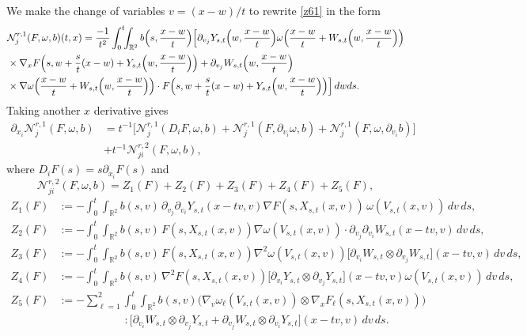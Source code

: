 \documentclass[reqno,11pt]{amsart}
\numberwithin{equation}{section}
\def\R{{\mathbb R}}
\def\R{{\bf R}}
\def\R{\mathbb{R}}
\begin{document}
We make the change of variables $v=(x-w)/t$ to rewrite \eqref{z61} in the form
\begin{align*}
&\mathcal N_j^{r,1}(F,\omega,b)(t,x)
=\frac{-1}{t^2}\int_0^t\!\!\int_{\mathbb R^2}b\Big(s,\frac{x-w}{t}\Big)
\Big[\partial_{v_j}Y_{s,t}\Big(w,\frac{x-w}{t}\Big)\omega\Big(\frac{x-w}{t}+W_{s,t}\Big(w,\frac{x-w}{t}\Big)\Big)\\
&\times\nabla_xF\Big(s,w+\frac{s}{t}(x-w)+Y_{s,t}\Big(w,\frac{x-w}{t}\Big)\Big)+\partial_{v_j}W_{s,t}\Big(w,\frac{x-w}{t}\Big)
\notag\\
&\times \nabla\omega\Big(\frac{x-w}{t}+W_{s,t}\Big(w,\frac{x-w}{t}\Big)\Big)\cdot F\Big(s,w+\frac{s}{t}(x-w)+Y_{s,t}\Big(w,\frac{x-w}{t}\Big)\Big)
\Big]\,dwds.
\end{align*}
Taking another $x$ derivative gives
\begin{equation}\label{n25}
\begin{split}
\partial_{x_i}\mathcal N_j^{r,1}(F,\omega,b)
&=t^{-1}\big[
\mathcal N_j^{r,1}(D_iF,\omega,b)
+\mathcal N_j^{r,1}(F,\partial_{v_i}\omega,b)
+\mathcal N_j^{r,1}(F,\omega,\partial_{v_i} b)\big]\\
&+t^{-1}\mathcal N_{ji}^{r,2}(F,\omega,b),
\end{split}
\end{equation}
where $D_iF(s)=s\partial_{x_i}F(s)$ and
\[
\mathcal N_{ji}^{r,2}(F,\omega,b)=Z_1(F)+Z_2(F)+Z_3(F)+Z_4(F)+Z_5(F),
\]
\begin{align*}
Z_1(F)&:=-\int_0^t\!\!\int_{\R^2}b(s,v)\,\partial_{v_j}\partial_{v_i}Y_{s,t}(x-tv,v)\nabla F(s,X_{s,t}(x,v))\,\omega(V_{s,t}(x,v))\,dv\,ds,\\
Z_2(F)&:=-\int_0^t\!\!\int_{\R^2} b(s,v)\,F(s,X_{s,t}(x,v))\nabla\omega(V_{s,t}(x,v))\cdot
\partial_{v_j}\partial_{v_i}W_{s,t}(x-tv,v)\,dv\,ds,\\
Z_3(F)&:=-\int_0^t\!\!\int_{\R^2} b(s,v)\,F(s,X_{s,t}(x,v))
\nabla^2\omega(V_{s,t}(x,v))\big[\partial_{v_i}W_{s,t}\otimes\partial_{v_j}W_{s,t}\big](x-tv,v)\,dv\,ds,\\
Z_4(F)&:=-\int_0^t\!\!\int_{\R^2} b(s,v)\,\nabla^2F(s,X_{s,t}(x,v))\big[\partial_{v_i}Y_{s,t}\otimes\partial_{v_j}Y_{s,t}\big](x-tv,v)
\omega(V_{s,t}(x,v))\,dv\,ds,\\
Z_5(F)&:=-\sum_{\ell=1}^2\int_0^t\!\!\int_{\R^2}b(s,v)\big(\nabla_v\omega_\ell(V_{s,t}(x,v))
\otimes\nabla_xF_\ell(s,X_{s,t}(x,v))\big)\\
&\qquad\qquad\qquad :\big[
\partial_{v_i}W_{s,t}\otimes\partial_{v_j}Y_{s,t}
+\partial_{v_j}W_{s,t}\otimes\partial_{v_i}Y_{s,t}
\big](x-tv,v)\,dv\,ds.
\end{align*}
\end{document}
